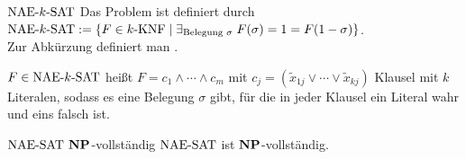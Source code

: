 \linie
\pagebreak

\begin{Def}{$\text{NAE-}k\text{-SAT}$}
    Das Problem  ist definiert durch\\
    $\text{NAE-}k\text{-SAT} := \{F \in k\text{-KNF} \;|\; \exists_{\text{Belegung } \sigma}\;
    F(\sigma) = 1 = F(1 - \sigma)\}$.\\
    Zur Abkürzung definiert man .
\end{Def}

\begin{Bem}
    $F \in \text{NAE-}k\text{-SAT}$ heißt $F = c_1 \land \dotsb \land c_m$ mit
    $c_j = (\widetilde{x}_{1j} \lor \dotsb \lor \widetilde{x}_{kj})$ Klausel
    mit $k$ Literalen, sodass es eine Belegung $\sigma$ gibt, für die in jeder Klausel ein
    Literal wahr und eins falsch ist.
\end{Bem}

\begin{Satz}{$\text{NAE-SAT}$ $\mathbf{NP}$-vollständig}
    $\text{NAE-SAT}$ ist $\mathbf{NP}$-vollständig.
\end{Satz}

